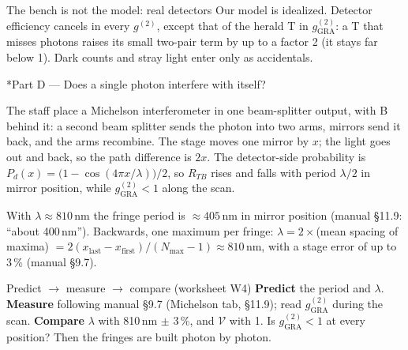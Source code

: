 \documentclass[a4paper,11pt]{article}
\makeatletter
\newcommand{\gtwo}[1]{g^{(2)}_{\mathrm{#1}}}
\renewcommand\section{\@startsection{section}{1}{\z@}{-1.6ex \@plus -.5ex}{0.6ex}{\normalfont\large\bfseries\color{ibmblue}}}
\makeatother
\begin{document}
\begin{devbox}{The bench is not the model: real detectors}
Our model is idealized. Detector efficiency cancels in every $g^{(2)}$, except that of the
herald T in $\gtwo{GRA}$: a T that misses photons raises its small two-pair term by up to a
factor 2 (it stays far below 1). Dark counts and stray light enter only as accidentals.
\end{devbox}

\section*{Part D --- Does a single photon interfere with itself?}

The staff place a Michelson interferometer in one beam-splitter output, with B behind it: a
second beam splitter sends the photon into two arms, mirrors send it back, and the arms
recombine. The stage moves one mirror by $x$; the light goes out and back, so the path
difference is $2x$. The detector-side probability is
$P_d(x) = \bigl(1 - \cos(4\pi x/\lambda)\bigr)/2$, so $R_{TB}$ rises and falls with period
$\lambda/2$ in mirror position, while $\gtwo{GRA} < 1$ along the scan.

\begin{numberbox}
With $\lambda \approx 810$\,nm the fringe period is $\approx 405$\,nm in mirror position
(manual \S11.9: ``about 400\,nm''). Backwards, one maximum per fringe:
$\lambda = 2\times$(mean spacing of maxima) $= 2(x_{\mathrm{last}} - x_{\mathrm{first}})/(N_{\max} - 1)
\approx 810$\,nm, with a stage error of up to 3\,\% (manual \S9.7).
\end{numberbox}

\begin{pmcbox}{Predict $\rightarrow$ measure $\rightarrow$ compare (worksheet W4)}
\textbf{Predict} the period and $\lambda$. \textbf{Measure} following manual \S9.7
(Michelson tab, \S11.9); read $\gtwo{GRA}$ during the scan. \textbf{Compare} $\lambda$ with
810\,nm $\pm$ 3\,\%, and $\mathcal{V}$ with 1. Is $\gtwo{GRA} < 1$ at every position? Then
the fringes are built photon by photon.
\end{pmcbox}
\end{document}
